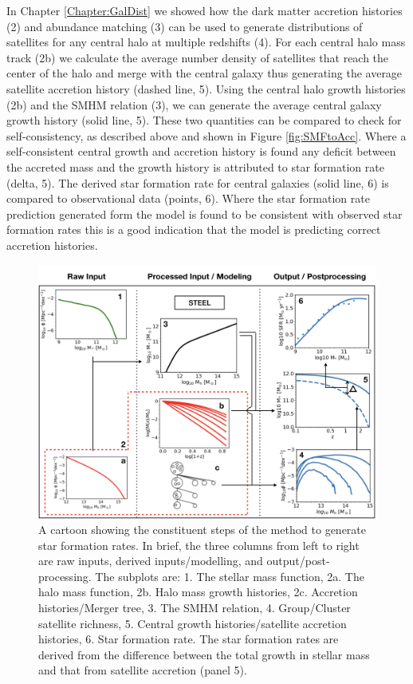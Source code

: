 In Chapter \ref{Chapter:GalDist} we showed how the \textcolor{MPLred}{dark matter accretion histories (2)} and abundance matching (3) can be used to generate \textcolor{MPLblue}{distributions of satellites for any central halo at multiple redshifts (4)}. For each \textcolor{MPLred}{central halo mass track (2b)} we calculate the average number density of satellites that reach the center of the halo and merge with the central galaxy \textcolor{MPLblue}{thus generating the average satellite accretion history (dashed line, 5)}. \textcolor{MPLred}{Using the central halo growth histories (2b)} and the SMHM relation (3), we can generate the \textcolor{MPLblue}{average central galaxy growth history (solid line, 5)}. These two quantities can be compared to check for self-consistency, as described above and shown in Figure \ref{fig:SMFtoAcc}. Where a self-consistent central growth and accretion history is found any deficit between the accreted mass and the growth history is attributed to \textcolor{MPLblue}{star formation rate (delta, 5)}. \textcolor{MPLblue}{The derived star formation rate for central galaxies (solid line, 6) is compared to observational data (points, 6)}. Where the star formation rate prediction generated form the model is found to be consistent with observed star formation rates this is a good indication that the model is predicting correct accretion histories.

\begin{figure}[h]
	\centering
	\includegraphics[width = \linewidth]{Figures/Chapter4/SFRFullCartoon.png}
    \caption{A cartoon showing the constituent steps of the method to generate star formation rates. In brief, the three columns from left to right are raw inputs, derived inputs/modelling, and output/post-processing. The subplots are: 1. The stellar mass function, 2a. The halo mass function, 2b. Halo mass growth histories, 2c. Accretion histories/Merger tree, 3. The SMHM relation, 4. Group/Cluster satellite richness, 5. Central growth histories/satellite accretion histories, 6. Star formation rate. The star formation rates are derived from the difference between the total growth in stellar mass and that from satellite accretion (panel 5).}
	\label{fig:SFRDerevation_Cartoon}
\end{figure}

